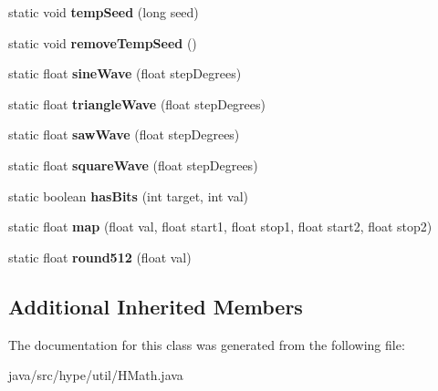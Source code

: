 \begin{DoxyCompactItemize}
\item 
\hypertarget{classhype_1_1util_1_1_h_math_aaa0f2ca11fbdaaa363c5c29ff1acf58b}{static void {\bfseries temp\-Seed} (long seed)}\label{classhype_1_1util_1_1_h_math_aaa0f2ca11fbdaaa363c5c29ff1acf58b}

\item 
\hypertarget{classhype_1_1util_1_1_h_math_a6209cbef5f9754065c2a7cdc38b43665}{static void {\bfseries remove\-Temp\-Seed} ()}\label{classhype_1_1util_1_1_h_math_a6209cbef5f9754065c2a7cdc38b43665}

\item 
\hypertarget{classhype_1_1util_1_1_h_math_a70432ca80abf61919404cd778100304a}{static float {\bfseries sine\-Wave} (float step\-Degrees)}\label{classhype_1_1util_1_1_h_math_a70432ca80abf61919404cd778100304a}

\item 
\hypertarget{classhype_1_1util_1_1_h_math_ad485c46a803bce9ecb67ffbc995e027a}{static float {\bfseries triangle\-Wave} (float step\-Degrees)}\label{classhype_1_1util_1_1_h_math_ad485c46a803bce9ecb67ffbc995e027a}

\item 
\hypertarget{classhype_1_1util_1_1_h_math_ae2cbf7905c5ec87a10ea532f2164f861}{static float {\bfseries saw\-Wave} (float step\-Degrees)}\label{classhype_1_1util_1_1_h_math_ae2cbf7905c5ec87a10ea532f2164f861}

\item 
\hypertarget{classhype_1_1util_1_1_h_math_a8fd18e82bb54ba01f12b3b87d329ec5f}{static float {\bfseries square\-Wave} (float step\-Degrees)}\label{classhype_1_1util_1_1_h_math_a8fd18e82bb54ba01f12b3b87d329ec5f}

\item 
\hypertarget{classhype_1_1util_1_1_h_math_af99cc1d7b58081d9f54187f49bfca833}{static boolean {\bfseries has\-Bits} (int target, int val)}\label{classhype_1_1util_1_1_h_math_af99cc1d7b58081d9f54187f49bfca833}

\item 
\hypertarget{classhype_1_1util_1_1_h_math_a0398dbad7de59e58af8982a9130bec5b}{static float {\bfseries map} (float val, float start1, float stop1, float start2, float stop2)}\label{classhype_1_1util_1_1_h_math_a0398dbad7de59e58af8982a9130bec5b}

\item 
\hypertarget{classhype_1_1util_1_1_h_math_a5ccd337fcd316215786488fc34aeb487}{static float {\bfseries round512} (float val)}\label{classhype_1_1util_1_1_h_math_a5ccd337fcd316215786488fc34aeb487}

\end{DoxyCompactItemize}
\subsection*{Additional Inherited Members}


The documentation for this class was generated from the following file\-:\begin{DoxyCompactItemize}
\item 
java/src/hype/util/H\-Math.\-java\end{DoxyCompactItemize}
